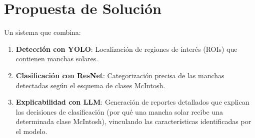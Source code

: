 \documentclass[conference]{IEEEtran}
\begin{document}

\section*{Propuesta de Solución}

Un sistema que combina:
\begin{enumerate}
    \item \textbf{Detección con YOLO}: Localización de regiones de interés (ROIs) que contienen manchas solares.
    \item \textbf{Clasificación con ResNet}: Categorización precisa de las manchas detectadas según el esquema de clases McIntosh.
    \item \textbf{Explicabilidad con LLM}: Generación de reportes detallados que explican las decisiones de clasificación (por qué una mancha solar recibe una determinada clase McIntosh), vinculando las características identificadas por el modelo.
\end{enumerate}
\end{document}
